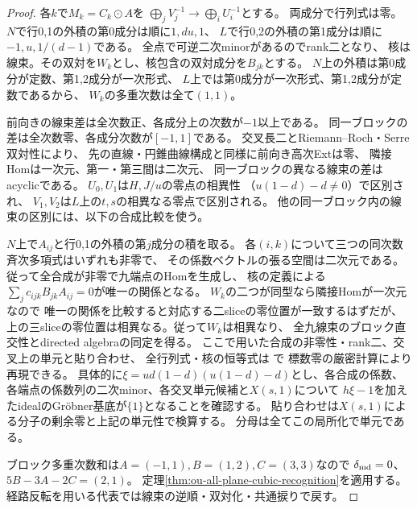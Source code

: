 \begin{proof}
各$k$で$M_k=C_k\odot A$を
$\bigoplus_j V_j^{-1}\to\bigoplus_i U_i^{-1}$とする。
両成分で行列式は零。
$N$で行0,1の外積の第0成分は順に$1,du,1$、
$L$で行0,2の外積の第1成分は順に$-1,u,1/(d-1)$である。
全点で可逆二次minorがあるのでrank二となり、
核は線束。その双対を$W_k$とし、核包含の双対成分を$B_{jk}$とする。
$N$上の外積は第0成分が定数、第1,2成分が一次形式、
$L$上では第0成分が一次形式、第1,2成分が定数であるから、
$W_k$の多重次数は全て$(1,1)$。

前向きの線束差は全次数正、各成分上の次数が$-1$以上である。
同一ブロックの差は全次数零、各成分次数が$[-1,1]$である。
交叉長二とRiemann--Roch・Serre双対性により、
先の直線・円錐曲線構成と同様に前向き高次Extは零、
隣接Homは一次元、第一・第三間は二次元、
同一ブロックの異なる線束の差はacyclicである。
$U_0,U_1$は$H,J/u$の零点の相異性
（$u(1-d)-d\ne0$）で区別され、
$V_1,V_2$は$L$上の$t,s$の相異なる零点で区別される。
他の同一ブロック内の線束の区別には、以下の合成比較を使う。

$N$上で$A_{ij}$と行0,1の外積の第$j$成分の積を取る。
各$(i,k)$について三つの同次数斉次多項式はいずれも非零で、
その係数ベクトルの張る空間は二次元である。
従って全合成が非零で九端点のHomを生成し、
核の定義による$\sum_j c_{ijk} B_{jk}A_{ij}=0$が唯一の関係となる。
$W_k$の二つが同型なら隣接Homが一次元なので
唯一の関係を比較すると対応する二sliceの零位置が一致するはずだが、
上の三sliceの零位置は相異なる。従って$W_k$は相異なり、
全九線束のブロック直交性とdirected algebraの同定を得る。
ここで用いた合成の非零性・rank二、交叉上の単元と貼り合わせ、
全行列式・核の恒等式は
で
標数零の厳密計算により再現できる。
具体的に$\xi=ud(1-d)(u(1-d)-d)$とし、各合成の係数、
各端点の係数列の二次minor、各交叉単元候補と$X(s,1)$について
$h\xi-1$を加えたidealのGröbner基底が$\{1\}$となることを確認する。
貼り合わせは$X(s,1)$による分子の剰余零と上記の単元性で検算する。
分母は全てこの局所化で単元である。

ブロック多重次数和は$A=(-1,1), B=(1,2), C=(3,3)$なので
$\delta_{\rm md}=0$、$5B-3A-2C=(2,1)$。
定理\ref{thm:ou-all-plane-cubic-recognition}を適用する。
経路反転を用いる代表では線束の逆順・双対化・共通捩りで戻す。
\end{proof}

